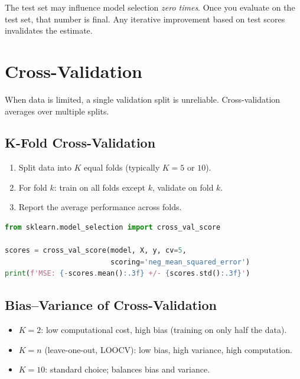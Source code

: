 \begin{principle}
	The test set may influence model selection \emph{zero times}. Once you evaluate on the test set, that number is final. Any iterative improvement based on test scores invalidates the estimate.
\end{principle}

\section{Cross-Validation}

When data is limited, a single validation split is unreliable. Cross-validation averages over multiple splits.

\subsection{K-Fold Cross-Validation}

\begin{enumerate}
	\item Split data into $K$ equal folds (typically $K = 5$ or $10$).
	\item For fold $k$: train on all folds except $k$, validate on fold $k$.
	\item Report the average performance across folds.
\end{enumerate}

\begin{lstlisting}[language=Python, caption=K-fold cross-validation]
from sklearn.model_selection import cross_val_score

scores = cross_val_score(model, X, y, cv=5,
                         scoring='neg_mean_squared_error')
print(f'MSE: {-scores.mean():.3f} +/- {scores.std():.3f}')
\end{lstlisting}

\subsection{Bias--Variance of Cross-Validation}

\begin{itemize}
	\item $K = 2$: low computational cost, high bias (training on only half the data).
	\item $K = n$ (leave-one-out, LOOCV): low bias, high variance, high computation.
	\item $K = 10$: standard choice; balances bias and variance.
\end{itemize}

